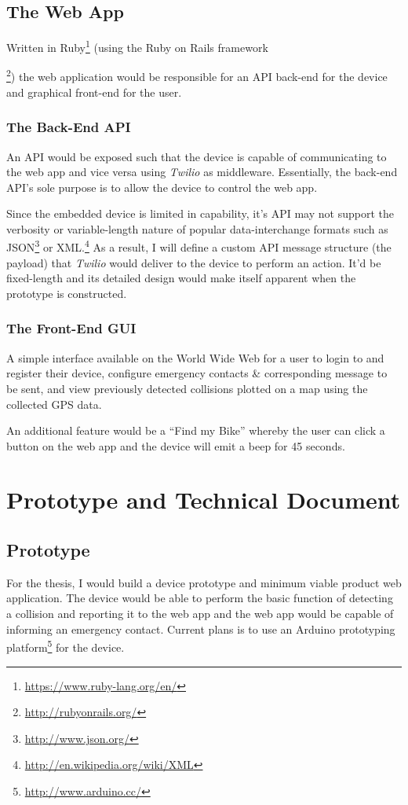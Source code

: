 \documentclass[titlepage]{article}
\begin{document}
\subsection{The Web App}
Written in Ruby\footnote{\url{https://www.ruby-lang.org/en/}} (using the Ruby on Rails framework{\footnote{\url{http://rubyonrails.org/}}) the web application would be responsible for an API back-end for the device and graphical front-end for the user.

\subsubsection{The Back-End API}
An API would be exposed such that the device is capable of communicating to the web app and vice versa using {\em Twilio} as middleware. Essentially, the back-end API's sole purpose is to allow the device to control the web app.

Since the embedded device is limited in capability, it's API may not support the verbosity or variable-length nature of popular data-interchange formats such as JSON\footnote{\url{http://www.json.org/}} or XML.\footnote{\url{http://en.wikipedia.org/wiki/XML}} As a result, I will define a custom API message structure (the payload) that {\em Twilio} would deliver to the device to perform an action. It'd be fixed-length and its detailed design would make itself apparent when the prototype is constructed.

\subsubsection{The Front-End GUI}
A simple interface available on the World Wide Web for a user to login to and register their device, configure emergency contacts \& corresponding message to be sent, and view previously detected collisions plotted on a map using the collected GPS data.

An additional feature would be a ``Find my Bike'' whereby the user can click a button on the web app and the device will emit a beep for 45 seconds.

\section{Prototype and Technical Document}
\subsection{Prototype}
For the thesis, I would build a device prototype and minimum viable product web application. The device would be able to perform the basic function of detecting a collision and reporting it to the web app and the web app would be capable of informing an emergency contact. Current plans is to use an Arduino prototyping platform\footnote{\url{http://www.arduino.cc/}} for the device.

}
\end{document}
